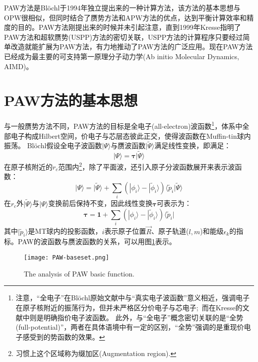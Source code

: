 
\textrm{PAW}方法是\textrm{Bl\"ochl}于1994年独立提出来的一种计算方法，该方法的基本思想与\textrm{OPW}很相似，但同时结合了赝势方法和\textrm{APW}方法的优点，达到平衡计算效率和精度的目的。\textrm{PAW}方法刚提出来的时候并未引起注意，直到1999年\textrm{Kresse}指明了\textrm{PAW}方法和超软赝势(\textrm{USPP})方法的密切关联，\textrm{USPP}方法的计算程序只要经过简单改造就能扩展为\textrm{PAW}方法，有力地推动了\textrm{PAW}方法的广泛应用。现在\textrm{PAW}方法已经成为最主要的可支持第一原理分子动力学\textrm{(Ab initio Molecular Dynamics, AIMD)}。

\section{\rm{PAW}方法的基本思想}
与一般赝势方法不同，\textrm{PAW}方法的目标是全电子(\textrm{all-electron})波函数\footnote{注意，“全电子”在\textrm{Bl\"ochl}原始文献\cite{PRB50-17953_1994}中与“真实电子波函数”意义相近，强调电子在原子核附近的振荡行为，但并未严格区分价电子与芯电子;~而在\textrm{Kresse}的文献\cite{PRB59-1758_1999}中则是明确指价电子波函数。%
此外，与“全电子”概念密切关联的是“全势(\textrm{full-potential})”，两者在具体语境中有一定的区别，“全势”强调的是重现价电子感受到的势函数的效果。}，体系中全部电子构成\textrm{Hilbert}空间，价电子与芯层态彼此正交，使得波函数在\textrm{Muffin-tin}球内振荡。
\textrm{Bl\"ochl}假设全电子波函数$|\Psi\rangle$与赝波函数$|\tilde\Psi\rangle$满足线性变换，即满足：
\begin{equation}
	|\Psi\rangle=\mathbf{\tau|}\tilde\Psi\rangle
	\label{eq:PAW-Blochl-01}
\end{equation}
在原子核附近的$r_c$范围内\footnote{习惯上这个区域称为缀加区(\textrm{Augmentation region}).}，除了平面波，还引入原子分波函数展开来表示波函数：
\begin{equation}
	|\Psi\rangle=|\tilde\Psi\rangle+\sum_i(|\phi_i\rangle-|\tilde\phi_i\rangle)\langle\tilde p_i|\tilde\Psi\rangle
	\label{eq:PAW-Blochl-02}
\end{equation}
在$r_c$外$|\tilde\Psi\rangle$与$|\Psi\rangle$变换前后保持不变，因此线性变换$\mathbf{\tau}$可表示为：
\begin{equation}
	\mathbf{\tau}=\mathbf{1}+\sum_i(|\phi_i\rangle-|\tilde\phi_i\rangle)\langle\tilde p_i|
	\label{eq:PAW-Blochl-03}
\end{equation}
其中$|\tilde p_i\rangle$是\textrm{MT}球内的投影函数，$i$表示原子位置$\vec R$、原子轨道($l,m$)和能级$\epsilon_k$的指标。\textrm{PAW}的波函数与赝波函数的关系，可以用图\ref{PAW_basic}表示。
\begin{figure}[h!]
\centering
\texttt{[image: PAW-baseset.png]}
\caption{\small \textrm{The analysis of PAW basic function.}}%
\label{PAW_basic}
\end{figure}

